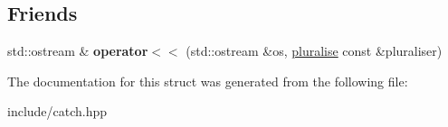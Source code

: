 \subsection*{Friends}
\begin{DoxyCompactItemize}
\item 
std\+::ostream \& {\bfseries operator$<$$<$} (std\+::ostream \&os, \hyperlink{structCatch_1_1pluralise}{pluralise} const \&pluraliser)\hypertarget{structCatch_1_1pluralise_aa7dac6b165514c1f85e0695d678fdef5}{}\label{structCatch_1_1pluralise_aa7dac6b165514c1f85e0695d678fdef5}

\end{DoxyCompactItemize}


The documentation for this struct was generated from the following file\+:\begin{DoxyCompactItemize}
\item 
include/catch.\+hpp\end{DoxyCompactItemize}

